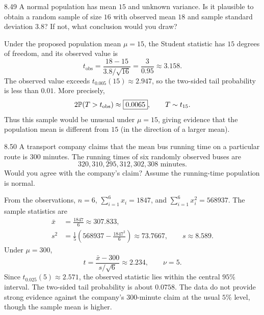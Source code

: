 \documentclass[11pt,oneside]{article}
\begin{document}
\begin{exercise}{8.49}
A normal population has mean $15$ and unknown variance. Is it plausible to obtain a random sample of size $16$ with observed mean $18$ and sample standard deviation $3.8$? If not, what conclusion would you draw?
\end{exercise}
\begin{solution}
Under the proposed population mean $\mu=15$, the Student statistic has $15$ degrees of freedom, and its observed value is
\[
t_{\mathrm{obs}}=\frac{18-15}{3.8/\sqrt{16}}=\frac{3}{0.95}\approx3.158.
\]
The observed value exceeds $t_{0.005}(15)\approx2.947$, so the two-sided tail probability is less than $0.01$. More precisely,
\[
2\mathbb{P}(T>t_{\mathrm{obs}})\approx\boxed{0.0065}, \qquad T\sim t_{15}.
\]
Thus this sample would be unusual under $\mu=15$, giving evidence that the population mean is different from $15$ (in the direction of a larger mean).
\end{solution}

\begin{exercise}{8.50}
A transport company claims that the mean bus running time on a particular route is $300$ minutes. The running times of six randomly observed buses are
\[
320, 310, 295, 312, 302, 308\text{ minutes}.
\]
Would you agree with the company's claim? Assume the running-time population is normal.
\end{exercise}
\begin{solution}
From the observations, $n=6$, $\sum_{i=1}^6 x_i=1847$, and $\sum_{i=1}^6 x_i^2=568937$. The sample statistics are
\[
\begin{aligned}
\bar x&=\frac{1847}{6}\approx307.833, \\
s^2&=\frac{1}{5}\left(568937-\frac{1847^2}{6}\right)\approx73.7667,
\qquad s\approx8.589.
\end{aligned}
\]
Under $\mu=300$,
\[
t=\frac{\bar x-300}{s/\sqrt6}\approx2.234, \qquad\nu=5.
\]
Since $t_{0.025}(5)\approx2.571$, the observed statistic lies within the central $95\%$ interval. The two-sided tail probability is about $0.0758$. The data do not provide strong evidence against the company's $300$-minute claim at the usual $5\%$ level, though the sample mean is higher.
\end{solution}
\end{document}
